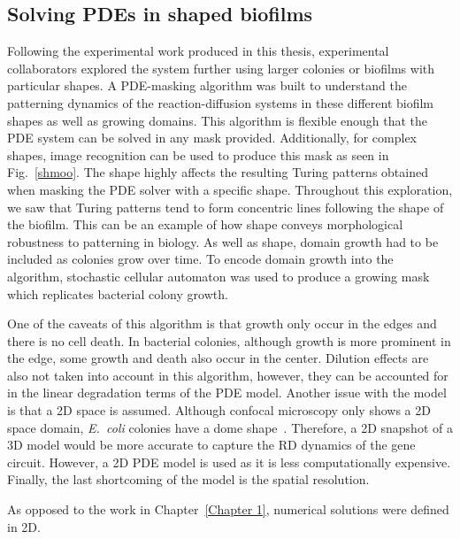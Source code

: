 \subsection{Solving PDEs in shaped biofilms}
Following the experimental work produced in this thesis, experimental collaborators explored the system further using larger colonies or biofilms with particular shapes.
A PDE-masking algorithm was built to understand the patterning dynamics of the reaction-diffusion systems in these different biofilm shapes as well as growing domains.
This algorithm is flexible enough that the PDE system can be solved in any mask provided.
Additionally, for complex shapes, image recognition can be used to produce this mask as seen in Fig.~\ref{shmoo}.
The shape highly affects the resulting Turing patterns obtained when masking the PDE solver with a specific shape.
Throughout this exploration, we saw that Turing patterns tend to form concentric lines following the shape of the biofilm.
This can be an example of how shape conveys morphological robustness to patterning in biology.
As well as shape, domain growth had to be included as colonies grow over time.
To encode domain growth into the algorithm, stochastic cellular automaton was used to produce a growing mask which replicates bacterial colony growth.

One of the caveats of this algorithm is that growth only occur in the edges and there is no cell death.
In bacterial colonies, although growth is more prominent in the edge, some growth and death also occur in the center.
Dilution effects are also not taken into account in this algorithm, however, they can be accounted for in the linear degradation terms of the PDE model.
Another issue with the model is that a 2D space is assumed.
Although confocal microscopy only shows a 2D space domain, \textit{E.~coli} colonies have a dome shape~\parencite{wimpenny1979growth}.
Therefore, a 2D snapshot of a 3D model would be more accurate to capture the RD dynamics of the gene circuit.
However, a 2D PDE model is used as it is less computationally expensive.
Finally, the last shortcoming of the model is the spatial resolution. 








As opposed to the work in Chapter~\ref{Chapter 1}, numerical solutions were defined in 2D.








